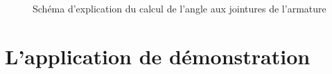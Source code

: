 \newpage

\begin{figure}[H]
 \centering
 \caption{Schéma d'explication du calcul de l'angle aux jointures de l'armature}
\end{figure}

\section{L'application de démonstration}